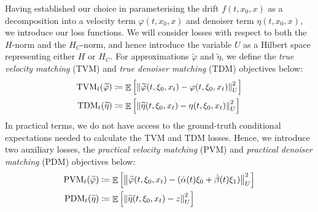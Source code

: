 Having established our choice in parameterising the drift \(f(t, x_{0}, x)\) as a decomposition into a velocity term \(\varphi(t, x_{0}, x)\) and denoiser term \(\eta(t, x_{0}, x)\), we introduce our loss functions. We will consider losses with respect to both the \(H\)-norm and the \(H_{C}\)-norm, and hence introduce the variable \(U\) as a Hilbert space representing either \(H\) or \(H_{C}\). For approximations \(\widetilde{\varphi}\) and \(\widetilde{\eta}\), we define the \textit{true velocity matching} (TVM) and \textit{true denoiser matching} (TDM) objectives below:
\begin{align}
  \mathrm{TVM}_{t}(\widetilde{\varphi}) &\coloneqq \mathop{\mathbb{E}}\qty[\norm{ \widetilde{\varphi}(t, \xi_{0}, x_{t}) - \varphi(t, \xi_{0}, x_{t})}^{2}_{U}]\label{eqn:TVM} \\
  \mathrm{TDM}_{t}(\widetilde{\eta}) &\coloneqq \mathop{\mathbb{E}}\qty[\norm{ \widetilde{\eta}(t, \xi_{0}, x_{t}) - \eta(t, \xi_{0}, x_{t})}^{2}_{U}] \label{eqn:tdm}
\end{align}
In practical terms, we do not have access to the ground-truth conditional expectations needed to calculate the TVM and TDM losses. Hence, we introduce two auxiliary losses, the \textit{practical velocity matching} (PVM) and \textit{practical denoiser matching} (PDM) objectives below:
\begin{align}
  \mathrm{PVM}_{t}(\widetilde{\varphi}) &\coloneqq \mathop{\mathbb{E}}\qty[\norm{ \widetilde{\varphi}(t, \xi_{0}, x_{t}) - (\dot{\alpha}(t) \xi_{0} + \dot{\beta}(t) \xi_{1})}^{2}_{U}] \label{eqn:PVM}\\
  \mathrm{PDM}_{t}(\widetilde{\eta}) &\coloneqq \mathop{\mathbb{E}}\qty[\norm{ \widetilde{\eta}(t, \xi_{0}, x_{t}) - z}^{2}_{U}] \label{eqn:pdm}
\end{align}

